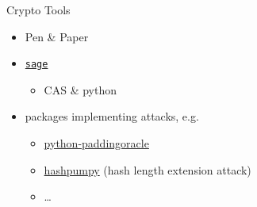 {
\begin{frame}


  \vspace{19em}

  \hspace*{\fill}{\Huge Cryptography}


%
%
\end{frame}
}

\begin{frame}
  {Crypto Tools}

  \begin{itemize}
    \item Pen \& Paper
  \end{itemize}
  \begin{itemize}
    \item \texttt{\href{http://www.sagemath.org/}{sage}}
      \begin{itemize}
        \item CAS \& python
      \end{itemize}
    \item packages implementing attacks, e.g.
      \begin{itemize}
        \item \href{http://mwielgoszewski.github.io/python-paddingoracle/}
          {python-paddingoracle}
        \item \href{https://github.com/bwall/HashPump}{hashpumpy} (hash length extension attack)
        \item \ldots
      \end{itemize}
  \end{itemize}
\end{frame}

